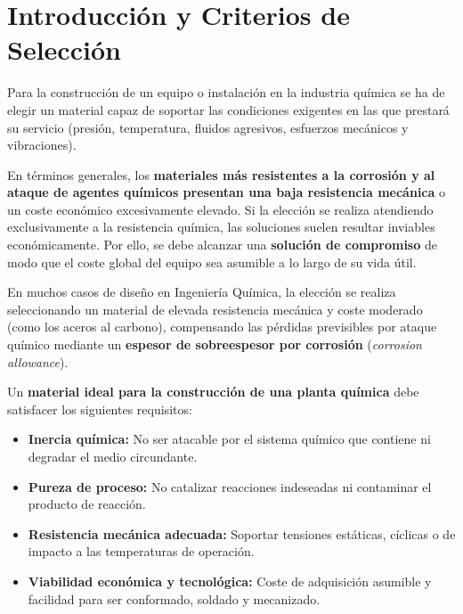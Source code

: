 \section{Introducción y Criterios de Selección}
Para la construcción de un equipo o instalación en la industria química se ha de elegir un material capaz de soportar las condiciones exigentes en las que prestará su servicio (presión, temperatura, fluidos agresivos, esfuerzos mecánicos y vibraciones).

En términos generales, los \textbf{materiales más resistentes a la corrosión y al ataque de agentes químicos presentan una baja resistencia mecánica} o un coste económico excesivamente elevado. Si la elección se realiza atendiendo exclusivamente a la resistencia química, las soluciones suelen resultar inviables económicamente. Por ello, se debe alcanzar una \textbf{solución de compromiso} de modo que el coste global del equipo sea asumible a lo largo de su vida útil.

En muchos casos de diseño en Ingeniería Química, la elección se realiza seleccionando un material de elevada resistencia mecánica y coste moderado (como los aceros al carbono), compensando las pérdidas previsibles por ataque químico mediante un \textbf{espesor de sobreespesor por corrosión} (\textit{corrosion allowance}).

Un \textbf{material ideal para la construcción de una planta química} debe satisfacer los siguientes requisitos:
\begin{itemize}
    \item \textbf{Inercia química:} No ser atacable por el sistema químico que contiene ni degradar el medio circundante.
    \item \textbf{Pureza de proceso:} No catalizar reacciones indeseadas ni contaminar el producto de reacción.
    \item \textbf{Resistencia mecánica adecuada:} Soportar tensiones estáticas, cíclicas o de impacto a las temperaturas de operación.
    \item \textbf{Viabilidad económica y tecnológica:} Coste de adquisición asumible y facilidad para ser conformado, soldado y mecanizado.
\end{itemize}
